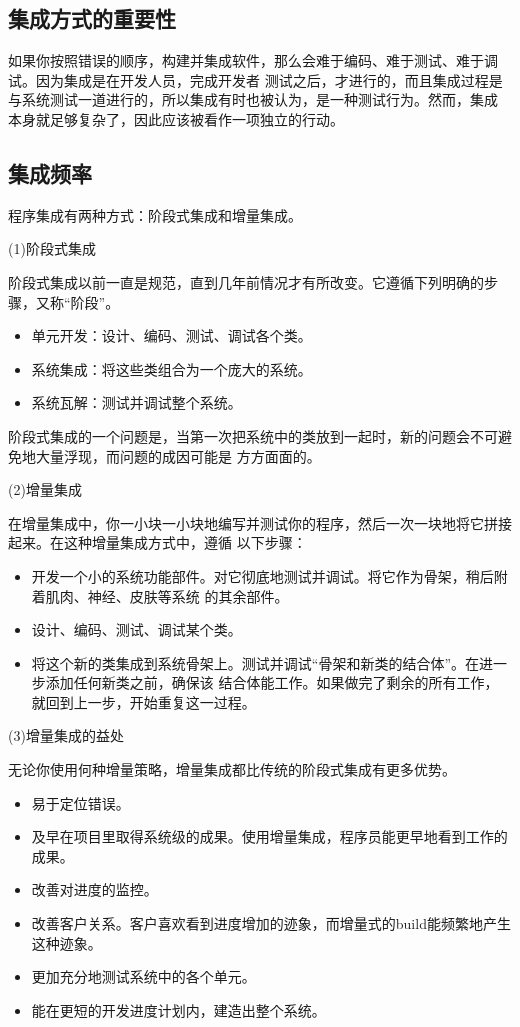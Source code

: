 \documentclass{article}
\begin{document}
\subsection{集成方式的重要性}
如果你按照错误的顺序，构建并集成软件，那么会难于编码、难于测试、难于调试。因为集成是在开发人员，完成开发者
测试之后，才进行的，而且集成过程是与系统测试一道进行的，所以集成有时也被认为，是一种测试行为。然而，集成
本身就足够复杂了，因此应该被看作一项独立的行动。

\subsection{集成频率}
程序集成有两种方式：阶段式集成和增量集成。
\par
(1)阶段式集成
\par
阶段式集成以前一直是规范，直到几年前情况才有所改变。它遵循下列明确的步骤，又称“阶段”。
\begin{itemize}
    \item 单元开发：设计、编码、测试、调试各个类。
    \item 系统集成：将这些类组合为一个庞大的系统。
    \item 系统瓦解：测试并调试整个系统。
\end{itemize}
阶段式集成的一个问题是，当第一次把系统中的类放到一起时，新的问题会不可避免地大量浮现，而问题的成因可能是
方方面面的。

\par
(2)增量集成
\par
在增量集成中，你一小块一小块地编写并测试你的程序，然后一次一块地将它拼接起来。在这种增量集成方式中，遵循
以下步骤：
\begin{itemize}
    \item 开发一个小的系统功能部件。对它彻底地测试并调试。将它作为骨架，稍后附着肌肉、神经、皮肤等系统
    的其余部件。
    \item 设计、编码、测试、调试某个类。
    \item 将这个新的类集成到系统骨架上。测试并调试“骨架和新类的结合体”。在进一步添加任何新类之前，确保该
    结合体能工作。如果做完了剩余的所有工作，就回到上一步，开始重复这一过程。
\end{itemize}

\par
(3)增量集成的益处
\par
无论你使用何种增量策略，增量集成都比传统的阶段式集成有更多优势。
\begin{itemize}
    \item 易于定位错误。
    \item 及早在项目里取得系统级的成果。使用增量集成，程序员能更早地看到工作的成果。
    \item 改善对进度的监控。
    \item 改善客户关系。客户喜欢看到进度增加的迹象，而增量式的build能频繁地产生这种迹象。
    \item 更加充分地测试系统中的各个单元。
    \item 能在更短的开发进度计划内，建造出整个系统。
\end{itemize}
\end{document}
